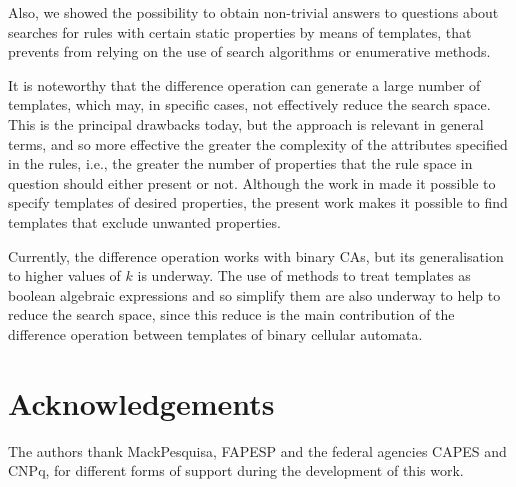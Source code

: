 \documentclass{llncs}
\begin{document}
Also, we showed the possibility to obtain non-trivial answers to questions about searches for rules with certain static properties by means of templates, that prevents from relying on the use of search algorithms or enumerative methods.

It is noteworthy that the difference operation can generate a large number of templates, which may, in specific cases, not effectively reduce the search space. This is the principal drawbacks today, but the approach is relevant in general terms, and so more effective the greater the complexity of the attributes specified in the rules, i.e., the greater the number of properties that the rule space in question should either present or not. Although the work in \cite{deOliveira2014,deOliveira2014b} made it possible to specify templates of desired properties, the present work makes it possible to find templates that exclude unwanted properties.

Currently, the difference operation works with binary CAs, but its generalisation to higher values of $k$ is underway. The use of methods to treat templates as boolean algebraic expressions and so simplify them are also underway to help to reduce the search space, since this reduce is the main contribution of the difference operation between templates of binary cellular automata.

\section*{Acknowledgements}
\label{sec:agrdecimentos}
The authors thank MackPesquisa, FAPESP and the federal agencies CAPES and CNPq, for different forms of support during the development of this work.
\end{document}
